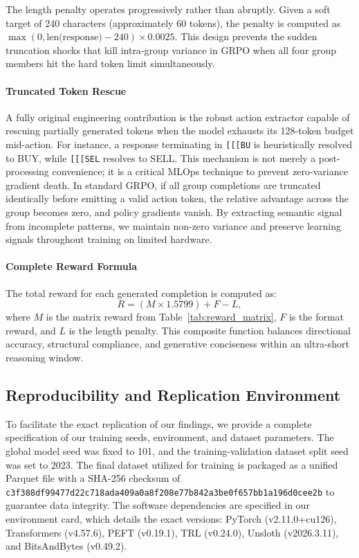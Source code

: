     The length penalty operates progressively rather than abruptly. Given a soft target of 240 characters (approximately 60 tokens), the penalty is computed as $\max(0, \text{len(response)} - 240) \times 0.0025$. This design prevents the sudden truncation shocks that kill intra-group variance in GRPO when all four group members hit the hard token limit simultaneously.

    \paragraph{Truncated Token Rescue}

    A fully original engineering contribution is the robust action extractor capable of rescuing partially generated tokens when the model exhausts its 128-token budget mid-action. For instance, a response terminating in \texttt{[[[BU} is heuristically resolved to BUY, while \texttt{[[[SEL} resolves to SELL. This mechanism is not merely a post-processing convenience; it is a critical MLOps technique to prevent zero-variance gradient death. In standard GRPO, if all group completions are truncated identically before emitting a valid action token, the relative advantage across the group becomes zero, and policy gradients vanish. By extracting semantic signal from incomplete patterns, we maintain non-zero variance and preserve learning signals throughout training on limited hardware.

    \paragraph{Complete Reward Formula}

    The total reward for each generated completion is computed as:
    \begin{equation}
    R = (M \times 1.5799) + F - L,
    \end{equation}
    where $M$ is the matrix reward from Table~\ref{tab:reward_matrix}, $F$ is the format reward, and $L$ is the length penalty. This composite function balances directional accuracy, structural compliance, and generative conciseness within an ultra-short reasoning window.

    \subsection{Reproducibility and Replication Environment}
    To facilitate the exact replication of our findings, we provide a complete specification of our training seeds, environment, and dataset parameters. The global model seed was fixed to 101, and the training-validation dataset split seed was set to 2023. The final dataset utilized for training is packaged as a unified Parquet file with a SHA-256 checksum of \texttt{c3f388df\allowbreak 99477d22\allowbreak c718ada4\allowbreak 09a0a8f2\allowbreak 08e77b84\allowbreak 2a3be0f6\allowbreak 57bb1a19\allowbreak 6d0cee2b} to guarantee data integrity. The software dependencies are specified in our environment card, which details the exact versions: PyTorch (v2.11.0+cu126), Transformers (v4.57.6), PEFT (v0.19.1), TRL (v0.24.0), Unsloth (v2026.3.11), and BitsAndBytes (v0.49.2). 




